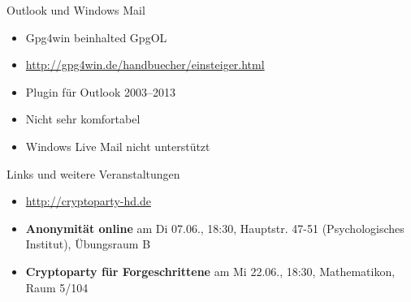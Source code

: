 \begin{frame}{Outlook und Windows Mail}
	\begin{itemize}
		\item Gpg4win beinhalted GpgOL
		\item \url{http://gpg4win.de/handbuecher/einsteiger.html}
		\item Plugin für Outlook 2003--2013
		\item Nicht sehr komfortabel
		\item Windows Live Mail nicht unterstützt
	\end{itemize}
\end{frame}

\begin{frame}{Links und weitere Veranstaltungen}
	\begin{itemize}
		\item \url{http://cryptoparty-hd.de} \\[10pt]
		\item \textbf{Anonymität online} am Di 07.06., 18:30, Hauptstr. 47-51 (Psychologisches Institut), Übungsraum B
		\item \textbf{Cryptoparty für Forgeschrittene} am Mi 22.06., 18:30, Mathematikon, Raum 5/104
	\end{itemize}
\end{frame}

